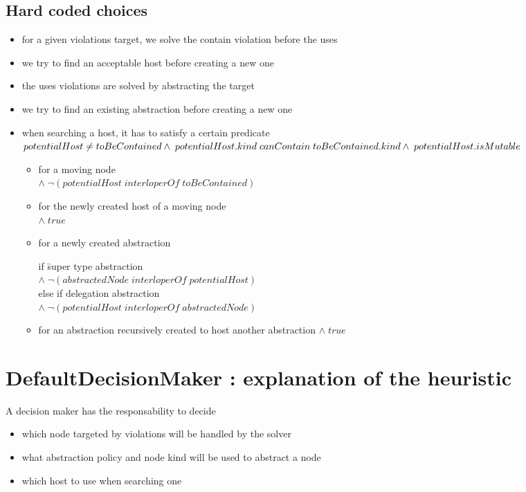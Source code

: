 \documentclass[]{article}
\begin{document}
\subsection{Hard coded choices}
\begin{itemize}
	\item for a given violations target, we solve the contain violation before the uses
	\item we try to find an acceptable host before creating a new one 
	\item the uses violations are solved by abstracting the target
	\item we try to find an existing abstraction before creating a new one
	\item when searching a host, it has to satisfy a certain predicate\\
		$potentialHost\neq toBeContained\\
		 \wedge\; potentialHost.kind\; canContain\; toBeContained.kind\\
		 \wedge\; potentialHost.isMutable$
		\begin{itemize}
			\item for a moving node\\
			$\wedge\; \neg (potentialHost\; interloperOf\; toBeContained)$
			\item for the newly created host of a moving node\\
			$\wedge\; true$
			\item for a newly created abstraction
			\begin{tabbing}
			if \=super type abstraction\\
			\>$\wedge\; \neg(abstractedNode\; interloperOf\; potentialHost)$\\
			else if delegation abstraction\\
			\>$\wedge\; \neg(potentialHost\; interloperOf\; abstractedNode)$
			\end{tabbing}
			\item for an abstraction recursively created to host another abstraction
			$\wedge\; true$
		\end{itemize}
\end{itemize}


\section{DefaultDecisionMaker : explanation of the heuristic }

A decision maker has the responsability to decide
\begin{itemize}
\item which node targeted by violations will be handled by the solver
\item what abstraction policy and node kind will be used to abstract a node
\item which host to use when searching one
\end{itemize}
\end{document}
